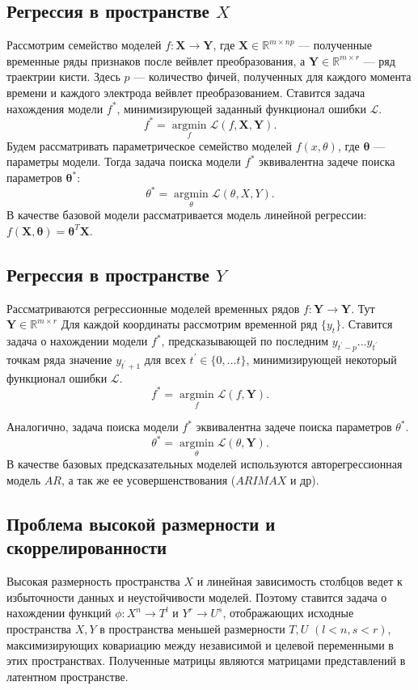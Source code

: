 \documentclass{article}
\newcommand{\argmin}{\mathop{\arg \min}\limits}
\begin{document}
\subsection{Регрессия в пространстве $X$}
Рассмотрим семейство моделей $f: \mathbf{X} \rightarrow \mathbf{Y}$, где $\mathbf{X} \in \mathbb{R}^{m \times np}$ --- полученные временные ряды признаков после вейвлет преобразования, а $\mathbf{Y} \in \mathbb{R}^{m \times r}$ --- ряд траектрии кисти. Здесь $p$ --- количество фичей, полученных для каждого момента времени и каждого электрода вейвлет преобразованием. Ставится задача нахождения модели $f^*$,  минимизирующей заданный функционал ошибки $\mathcal{L}$.
\begin{equation}
	f^* = \argmin_f \mathcal{L}(f, \mathbf{X}, \mathbf{Y}).
\end{equation}
Будем рассматривать параметрическое семейство моделей $f(x, \theta)$, где $\mathbf{\theta}$ --- параметры модели. Тогда задача поиска модели $f^*$ эквивалентна задече поиска параметров $\mathbf{\theta^*}$:
\begin{equation}
\theta^* = \argmin_{\theta} \mathcal{L}(\theta, X, Y).
\end{equation}
В качестве базовой модели рассматривается модель линейной регрессии:$f(\mathbf{X}, \mathbf{\theta}) = \mathbf{\theta}^T\mathbf{X}$.
\subsection{Регрессия в пространстве $Y$}
Рассматриваются регрессионные моделей временных рядов $f : \mathbf{Y} \rightarrow \mathbf{Y}$. Тут $\mathbf{Y} \in  \mathbb{R}^{m \times r}$ Для каждой координаты рассмотрим временной ряд $\{y_t\}$. Ставится задача о нахождении модели $f^*$, предсказывающей по последним $y_{t^{'}-p} \dots y_{t^{'}}$ точкам ряда значение $y_{t^{'}+1}$ для всех $t^{'} \in \{0, \dots t\}$, минимизирующей некоторый функционал ошибки $ \mathcal{L}$.
\begin{equation}
	f^* = \argmin_f \mathcal{L}(f, \mathbf{Y}).
\end{equation}

Аналогично, задача поиска модели $f^*$ эквивалентна задече поиска параметров $\theta^*$.
\begin{equation}
\theta^* = \argmin_{\theta} \mathcal{L}(\theta, \mathbf{Y}).
\end{equation}
В качестве базовых предсказательных моделей используются авторегрессионная модель $AR$, а так же ее усовершенствования ($ARIMAX$ \cite{7514029} и др).
\subsection{Проблема высокой размерности и скоррелированности}
Высокая размерность пространства $X$ и линейная зависимость столбцов ведет к избыточности данных и неустойчивости моделей. Поэтому ставится задача о нахождении функций $\phi: X^n \rightarrow T^l$ и  $Y^r \rightarrow U^s$, отображающих исходные пространства $X, Y$ в пространства меньшей размерности $T, U$ $(l < n, s < r)$, максимизирующих ковариацию между независимой и целевой переменными в этих пространствах. Полученные матрицы являются матрицами представлений в латентном пространстве.
\end{document}
